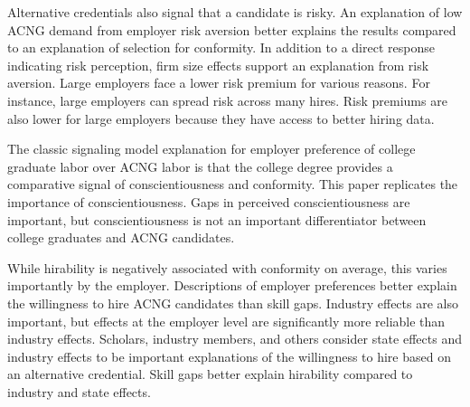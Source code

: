 Alternative credentials also signal that a candidate is risky.
An explanation of low ACNG demand from employer risk aversion better explains the results
compared to an explanation of selection for conformity.
In addition to a direct response indicating risk perception, firm size effects support an explanation from risk aversion.
Large employers face a lower risk premium for various reasons.
For instance, large employers can spread risk across many hires.
Risk premiums are also lower for large employers because they have access to better hiring data.

The classic signaling model explanation for employer preference of college graduate labor over ACNG labor is that
the college degree provides a comparative signal of conscientiousness and conformity.
This paper replicates the importance of conscientiousness.
Gaps in perceived conscientiousness are important,
but conscientiousness is not an important differentiator between college graduates and ACNG candidates.

While hirability is negatively associated with conformity on average, this varies importantly by the employer.
Descriptions of employer preferences better explain the willingness to hire ACNG candidates than skill gaps.
Industry effects are also important, but effects at the employer level are significantly more reliable than industry effects.
Scholars, industry members,
and others consider state effects
and industry effects to be important explanations of the willingness to hire based on an alternative credential.
Skill gaps better explain hirability compared to industry and state effects.


